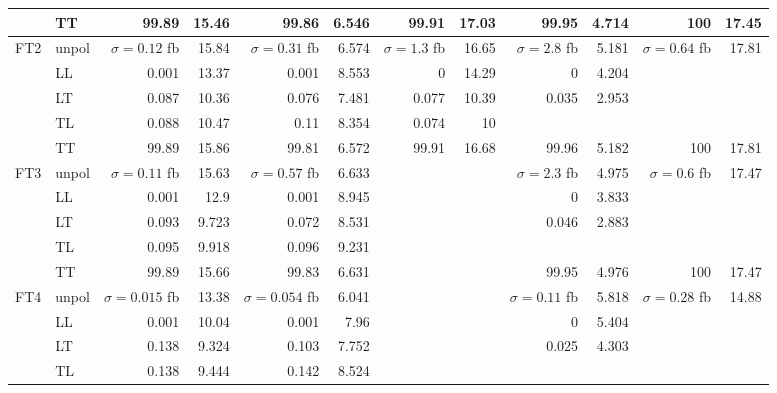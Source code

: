 \begin{table}[H]
{\begin{tabular}{llrrrrrrrrrr}
 & TT & \num{99.89} & \num{15.46} & \num{99.86} & \num{6.546} & \num{99.91} & \num{17.03} & \num{99.95} & \num{4.714} & \num{100} & \num{17.45} \\
\midrule
\multirow{5}{*}{FT2}
 & unpol & $\sigma = \num{0.12}$ fb & \num{15.84} & $\sigma = \num{0.31}$ fb & \num{6.574} & $\sigma = \num{1.3}$ fb & \num{16.65} & $\sigma = \num{2.8}$ fb & \num{5.181} & $\sigma = \num{0.64}$ fb & \num{17.81} \\
 & LL & \num{0.001} & \num{13.37} & \num{0.001} & \num{8.553} & \num{0} & \num{14.29} & \num{0} & \num{4.204} &  &  \\
 & LT & \num{0.087} & \num{10.36} & \num{0.076} & \num{7.481} & \num{0.077} & \num{10.39} & \num{0.035} & \num{2.953} &  &  \\
 & TL & \num{0.088} & \num{10.47} & \num{0.11} & \num{8.354} & \num{0.074} & \num{10} &  &  &  &  \\
 & TT & \num{99.89} & \num{15.86} & \num{99.81} & \num{6.572} & \num{99.91} & \num{16.68} & \num{99.96} & \num{5.182} & \num{100} & \num{17.81} \\
\midrule
\multirow{5}{*}{FT3}
 & unpol & $\sigma = \num{0.11}$ fb & \num{15.63} & $\sigma = \num{0.57}$ fb & \num{6.633} &  &  & $\sigma = \num{2.3}$ fb & \num{4.975} & $\sigma = \num{0.6}$ fb & \num{17.47} \\
 & LL & \num{0.001} & \num{12.9} & \num{0.001} & \num{8.945} &  &  & \num{0} & \num{3.833} &  &  \\
 & LT & \num{0.093} & \num{9.723} & \num{0.072} & \num{8.531} &  &  & \num{0.046} & \num{2.883} &  &  \\
 & TL & \num{0.095} & \num{9.918} & \num{0.096} & \num{9.231} &  &  &  &  &  &  \\
 & TT & \num{99.89} & \num{15.66} & \num{99.83} & \num{6.631} &  &  & \num{99.95} & \num{4.976} & \num{100} & \num{17.47} \\
\midrule
\multirow{5}{*}{FT4}
 & unpol & $\sigma = \num{0.015}$ fb & \num{13.38} & $\sigma = \num{0.054}$ fb & \num{6.041} &  &  & $\sigma = \num{0.11}$ fb & \num{5.818} & $\sigma = \num{0.28}$ fb & \num{14.88} \\
 & LL & \num{0.001} & \num{10.04} & \num{0.001} & \num{7.96} &  &  & \num{0} & \num{5.404} &  &  \\
 & LT & \num{0.138} & \num{9.324} & \num{0.103} & \num{7.752} &  &  & \num{0.025} & \num{4.303} &  &  \\
 & TL & \num{0.138} & \num{9.444} & \num{0.142} & \num{8.524} &  &  &  &  &  &  \\

\end{tabular}}
\end{table}
